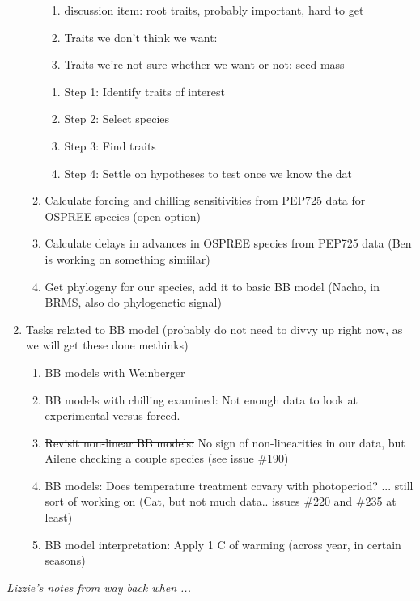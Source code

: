 \documentclass[11pt,letterpaper]{article}
\begin{document}
\begin{enumerate}
\begin{enumerate}
\begin{enumerate}
\item discussion item: root traits, probably important, hard to get
\item Traits we don't think we want: 
\item Traits we're not sure whether we want or not: seed mass
\end{enumerate}
\begin{enumerate}
\item Step 1: Identify traits of interest
\item Step 2: Select species
\item Step 3: Find traits
\item Step 4: Settle on hypotheses to test once we know the dat
\end{enumerate}
\item Calculate forcing and chilling sensitivities from PEP725 data for OSPREE species (open option)
\item Calculate delays in advances in OSPREE species from PEP725 data (Ben is working on something simiilar)
\item Get phylogeny for our species, add it to basic BB model (Nacho, in BRMS, also do phylogenetic signal)
\end{enumerate}
\item Tasks related to BB model (probably do not need to divvy up right now, as we will get these done methinks)
\begin{enumerate}
\item BB models with Weinberger
\item \st{BB models with chilling examined:} Not enough data to look at experimental versus forced. 
\item \st{Revisit non-linear BB models:} No sign of non-linearities in our data, but Ailene checking a couple species (see issue \#190)
\item BB models: Does temperature treatment covary with photoperiod? ... still sort of working on (Cat, but not much data.. issues \#220 and \#235 at least) 
\item BB model interpretation: Apply 1 C of warming (across year, in certain seasons)
\end{enumerate}
\end{enumerate} 

\emph{Lizzie's notes from way back when ...}\\
\end{document}

